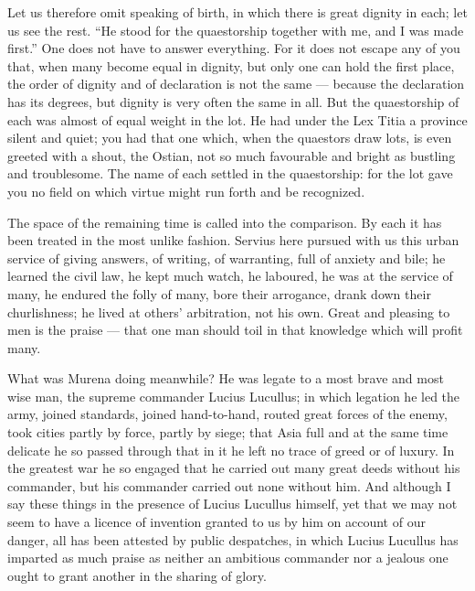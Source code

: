  Let us therefore omit speaking of birth, in which there is great dignity in each; let us see the rest. ``He stood for the quaestorship together with me, and I was made first.'' One does not have to answer everything. For it does not escape any of you that, when many become equal in dignity, but only one can hold the first place, the order of dignity and of declaration is not the same --- because the declaration has its degrees, but dignity is very often the same in all. But the quaestorship of each was almost of equal weight in the lot. He had under the Lex Titia a province silent and quiet; you had that one which, when the quaestors draw lots, is even greeted with a shout, the Ostian, not so much favourable and bright as bustling and troublesome. The name of each settled in the quaestorship: for the lot gave you no field on which virtue might run forth and be recognized.

 The space of the remaining time is called into the comparison. By each it has been treated in the most unlike fashion. Servius here pursued with us this urban service of giving answers, of writing, of warranting, full of anxiety and bile; he learned the civil law, he kept much watch, he laboured, he was at the service of many, he endured the folly of many, bore their arrogance, drank down their churlishness; he lived at others' arbitration, not his own. Great and pleasing to men is the praise --- that one man should toil in that knowledge which will profit many.

 What was Murena doing meanwhile? He was legate to a most brave and most wise man, the supreme commander Lucius Lucullus; in which legation he led the army, joined standards, joined hand-to-hand, routed great forces of the enemy, took cities partly by force, partly by siege; that Asia full and at the same time delicate he so passed through that in it he left no trace of greed or of luxury. In the greatest war he so engaged that he carried out many great deeds without his commander, but his commander carried out none without him. And although I say these things in the presence of Lucius Lucullus himself, yet that we may not seem to have a licence of invention granted to us by him on account of our danger, all has been attested by public despatches, in which Lucius Lucullus has imparted as much praise as neither an ambitious commander nor a jealous one ought to grant another in the sharing of glory.

